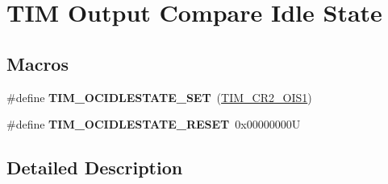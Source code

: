 \hypertarget{group___t_i_m___output___compare___idle___state}{}\section{T\+IM Output Compare Idle State}
\label{group___t_i_m___output___compare___idle___state}
\subsection*{Macros}
\begin{DoxyCompactItemize}
\item 
\mbox{\label{group___t_i_m___output___compare___idle___state_gad251b83b0e33ddd0ed2fb35aa747ef78}} 
\#define {\bfseries T\+I\+M\+\_\+\+O\+C\+I\+D\+L\+E\+S\+T\+A\+T\+E\+\_\+\+S\+ET}~(\mbox{\hyperlink{group___peripheral___registers___bits___definition_ga31b26bf058f88d771c33aff85ec89358}{T\+I\+M\+\_\+\+C\+R2\+\_\+\+O\+I\+S1}})
\item 
\mbox{\label{group___t_i_m___output___compare___idle___state_ga56505fe4142096454f1da97683ce8bc2}} 
\#define {\bfseries T\+I\+M\+\_\+\+O\+C\+I\+D\+L\+E\+S\+T\+A\+T\+E\+\_\+\+R\+E\+S\+ET}~0x00000000U
\end{DoxyCompactItemize}


\subsection{Detailed Description}
